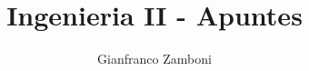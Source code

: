 




\title{Ingenieria II - Apuntes}
\author{Gianfranco Zamboni}

	
\maketitle
\tableofcontents

\newpage


\newpage



\newpage


\newpage


\newpage







